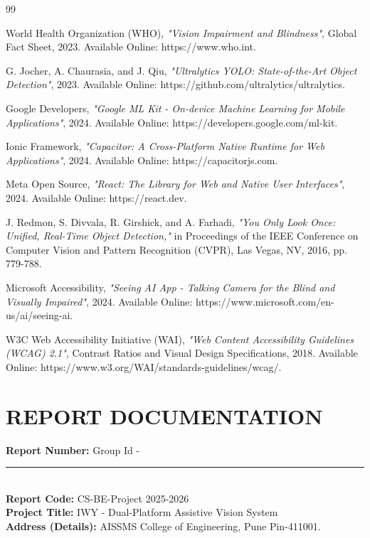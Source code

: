 \documentclass[12pt, a4paper]{report}
\begin{document}
\renewcommand{\bibname}{REFERENCES}
\begin{thebibliography}{99}

World Health Organization (WHO), \textit{"Vision Impairment and Blindness"}, Global Fact Sheet, 2023. Available Online: https://www.who.int.

G. Jocher, A. Chaurasia, and J. Qiu, \textit{"Ultralytics YOLO: State-of-the-Art Object Detection"}, 2023. Available Online: https://github.com/ultralytics/ultralytics.

Google Developers, \textit{"Google ML Kit - On-device Machine Learning for Mobile Applications"}, 2024. Available Online: https://developers.google.com/ml-kit.

Ionic Framework, \textit{"Capacitor: A Cross-Platform Native Runtime for Web Applications"}, 2024. Available Online: https://capacitorjs.com.

Meta Open Source, \textit{"React: The Library for Web and Native User Interfaces"}, 2024. Available Online: https://react.dev.

J. Redmon, S. Divvala, R. Girshick, and A. Farhadi, \textit{"You Only Look Once: Unified, Real-Time Object Detection,"} in Proceedings of the IEEE Conference on Computer Vision and Pattern Recognition (CVPR), Las Vegas, NV, 2016, pp. 779-788.

Microsoft Accessibility, \textit{"Seeing AI App - Talking Camera for the Blind and Visually Impaired"}, 2024. Available Online: https://www.microsoft.com/en-us/ai/seeing-ai.

W3C Web Accessibility Initiative (WAI), \textit{"Web Content Accessibility Guidelines (WCAG) 2.1"}, Contrast Ratios and Visual Design Specifications, 2018. Available Online: https://www.w3.org/WAI/standards-guidelines/wcag/.

\end{thebibliography}

\newpage
\chapter*{REPORT DOCUMENTATION}

\noindent
\textbf{Report Number:} Group Id - \rule{2cm}{0.15mm} \\
\textbf{Report Code:} CS-BE-Project 2025-2026 \\
\textbf{Project Title:} IWY - Dual-Platform Assistive Vision System \\
\textbf{Address (Details):} AISSMS College of Engineering, Pune Pin-411001. \\[0.5cm]
\end{document}
